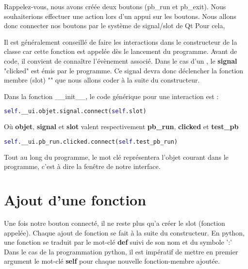 {Rappelez-vous, nous avons créée deux boutons (pb\_run et pb\_exit). Nous souhaiterions effectuer une action lors d'un appui sur les boutons. \newline
Nous allons donc connecter nos boutons par le système de signal/slot de Qt
Pour cela, \newline

Il est généralement conseillé de faire les interactions dans le constructeur de la classe car cette fonction est appelée dès le lancement du programme. \newline
Avant de code, il convient de connaître l'évènement associé. Dans le cas d'un , le \textbf{signal} "clicked" est émis par le programme. \newline
Ce signal devra donc déclencher la fonction membre (slot) "" que nous allons coder à la suite du constructeur. \newline

Dans la fonction \_\_init\_\_, le code générique pour une interaction est  : \newline
\begin{lstlisting}[language=python]
	 self.__ui.objet.signal.connect(self.slot)
\end{lstlisting}
Où \textbf{objet}, \textbf{signal} et \textbf{slot} valent respectivement \textbf{pb\_run}, \textbf{clicked} et \textbf{test\_pb}
\begin{lstlisting}[language=python]
	 self.__ui.pb_run.clicked.connect(self.test_pb_run)
\end{lstlisting}
Tout au long du programme, le mot clé  représentera l'objet courant dans le programme, c'est à dire la fenêtre de notre interface. \newline

\section{Ajout d'une fonction}

Une fois notre bouton connecté, il ne reste plus qu'a créer le slot (fonction appelée). \newline
Chaque ajout de fonction se fait à la suite du constructeur.
En python, une fonction se traduit par le mot-clé \textbf{def} suivi de son nom et du symbole ':' \newline
{\color{red}Dans le cas de la programmation python, il est impératif de mettre en premier argument le mot-clé \textbf{self} pour chaque nouvelle fonction-membre ajoutée.} \newline

}

